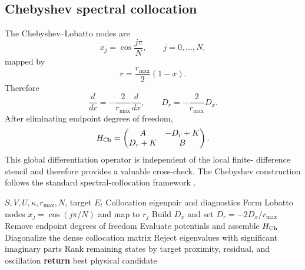 \documentclass[a4paper,fleqn]{cas-dc}
\begin{document}
\subsection{Chebyshev spectral collocation}
The Chebyshev--Lobatto nodes are
\begin{equation}
x_j=\cos\frac{j\pi}{N},
\qquad
j=0,\ldots,N,
\end{equation}
mapped by
\begin{equation}
r=\frac{r_{\max}}2(1-x).
\end{equation}
Therefore
\begin{equation}
\frac{d}{dr}=-\frac{2}{r_{\max}}\frac{d}{dx},
\qquad
D_r=-\frac{2}{r_{\max}}D_x.
\end{equation}
After eliminating endpoint degrees of freedom,
\begin{equation}
H_{\rm Ch}=
\begin{pmatrix}
A&-D_r+K\\
D_r+K&B
\end{pmatrix}.
\end{equation}
This global differentiation operator is independent of the local finite-
difference stencil and therefore provides a valuable cross-check. The
Chebyshev construction follows the standard spectral-collocation framework
\cite{Trefethen2000}.


\begin{algorithm}[t]
\caption{Chebyshev collocation solver}
\label{alg:cheb}
\begin{algorithmic}[1]
\Require $S,V,U,\kappa,r_{\max},N$, target $E_t$
\Ensure Collocation eigenpair and diagnostics
\State Form Lobatto nodes $x_j=\cos(j\pi/N)$ and map to $r_j$
\State Build $D_x$ and set $D_r=-2D_x/r_{\max}$
\State Remove endpoint degrees of freedom
\State Evaluate potentials and assemble $H_{\rm Ch}$
\State Diagonalize the dense collocation matrix
\State Reject eigenvalues with significant imaginary parts
\State Rank remaining states by target proximity, residual, and oscillation
\State \textbf{return} best physical candidate
\end{algorithmic}
\end{algorithm}
\end{document}
